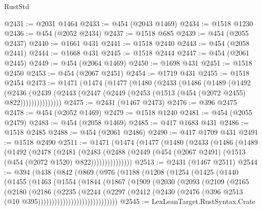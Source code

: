 \begin{lexlean}{RustStd}
\begin{coremodule}
@2431 := @2031 @1464
@2433 := @454 (@2043 @1469)
@2434 := @1518 @1230
@2436 := @454 (@2052 @2434)
@2437 := @1518 @685
@2439 := @454 (@2055 @2437)
@2440 := @1661 @431
@2441 := @1518 @2440
@2443 := @454 (@2058 @2441)
@2444 := @1668 @431
@2445 := @1518 @2444
@2447 := @454 (@2061 @2445)
@2449 := @454 (@2064 @1469)
@2450 := @1698 @431
@2451 := @1518 @2450
@2453 := @454 (@2067 @2451)
@2454 := @1719 @431
@2455 := @1518 @2454
@2473 := @1471
    (@1474
      (@1477
        (@1480
          (@2433
            (@1486
              (@1489
                (@1492
                  (@2436
                    (@2439
                      (@2443 (@2447 (@2449 (@2453 (@1513 (@454 (@2072 @2455) @822)))))))))))))))
@2475 := @2431 (@1467 @2473)
@2476 := @396 @2475
@2478 := @454 (@2052 @1469)
@2479 := @1518 @1240
@2481 := @454 (@2055 @2479)
@2483 := @454 (@2058 @1469)
@2485 := @417 @1683 @431
@2486 := @1518 @2485
@2488 := @454 (@2061 @2486)
@2490 := @417 @1709 @431
@2491 := @1518 @2490
@2511 := @1471
    (@1474
      (@1477
        (@1480
          (@2433
            (@1486
              (@1489
                (@1492
                  (@2478
                    (@2481
                      (@2483
                        (@2488
                          (@2449 (@454 (@2067 @2491) (@1513 (@454 (@2072 @1520) @822)))))))))))))))
@2513 := @2431 (@1467 @2511)
@2544 := @394
    (@438
      (@842
        (@869
          (@976
            (@1188
              (@1208
                (@1254
                  (@1425
                    (@1440
                      (@1455
                        (@1463
                          (@1554
                            (@1844
                              (@1867
                                (@1909
                                  (@2030
                                    (@2093
                                      (@2109
                                        (@2165
                                          (@2180
                                            (@2186
                                              (@2235
                                                (@2244
                                                  (@2297
                                                    (@2412
                                                      (@2430
                                                        (@2476
                                                          (@396
                                                            @2513
                                                            (@10 @395)))))))))))))))))))))))))))))
@2545 := LexLeanTarget.RustSyntax.Crate

\end{coremodule}
\end{lexlean}
